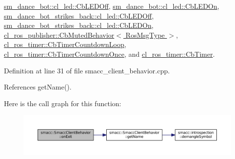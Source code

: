 \hyperlink{classsm__dance__bot_1_1cl__led_1_1CbLEDOff_ad0db28985308dd486943d1f511c655ad}{sm\+\_\+dance\+\_\+bot\+::cl\+\_\+led\+::\+Cb\+L\+E\+D\+Off}, \hyperlink{classsm__dance__bot_1_1cl__led_1_1CbLEDOn_a60a82058c585b4d0398b531c1e1bdf0b}{sm\+\_\+dance\+\_\+bot\+::cl\+\_\+led\+::\+Cb\+L\+E\+D\+On}, \hyperlink{classsm__dance__bot__strikes__back_1_1cl__led_1_1CbLEDOff_a6b4ac6e1c516ced8515e6b6641c5d063}{sm\+\_\+dance\+\_\+bot\+\_\+strikes\+\_\+back\+::cl\+\_\+led\+::\+Cb\+L\+E\+D\+Off}, \hyperlink{classsm__dance__bot__strikes__back_1_1cl__led_1_1CbLEDOn_aadafa99cd7c683a9d1ae59b5158826d9}{sm\+\_\+dance\+\_\+bot\+\_\+strikes\+\_\+back\+::cl\+\_\+led\+::\+Cb\+L\+E\+D\+On}, \hyperlink{classcl__ros__publisher_1_1CbMutedBehavior_a4c02187c58358fa811777d9956510222}{cl\+\_\+ros\+\_\+publisher\+::\+Cb\+Muted\+Behavior$<$ Ros\+Msg\+Type $>$}, \hyperlink{classcl__ros__timer_1_1CbTimerCountdownLoop_a5623e9fdd8f0fb23e8707f7816c099d6}{cl\+\_\+ros\+\_\+timer\+::\+Cb\+Timer\+Countdown\+Loop}, \hyperlink{classcl__ros__timer_1_1CbTimerCountdownOnce_ab602b778a299b42e8cc9f4bf3da0a234}{cl\+\_\+ros\+\_\+timer\+::\+Cb\+Timer\+Countdown\+Once}, and \hyperlink{classcl__ros__timer_1_1CbTimer_a04184e2679c32363c876e1d6b4746072}{cl\+\_\+ros\+\_\+timer\+::\+Cb\+Timer}.



Definition at line 31 of file smacc\+\_\+client\+\_\+behavior.\+cpp.



References get\+Name().




Here is the call graph for this function\+:
\nopagebreak
\begin{figure}[H]
\begin{center}
\leavevmode
\includegraphics[width=350pt]{classsmacc_1_1SmaccClientBehavior_ac0cd72d42bd00425362a97c9803ecce5_cgraph}
\end{center}
\end{figure}


